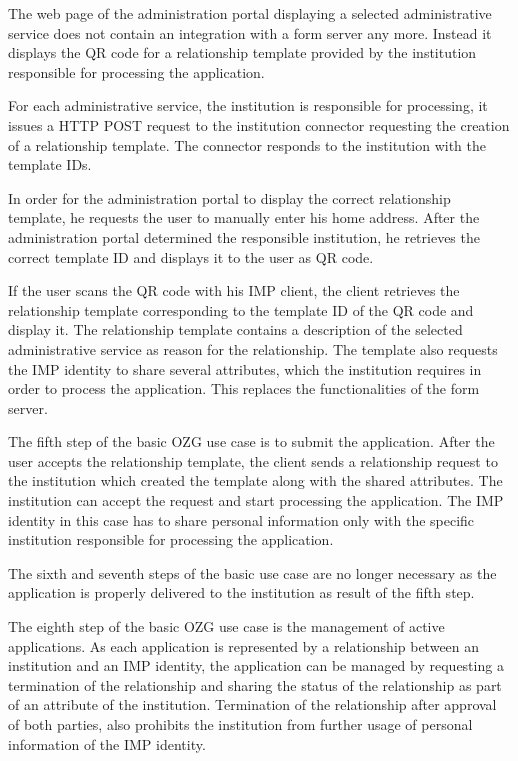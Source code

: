 \documentclass[
     12pt,         %
     a4paper,      %
     BCOR=10mm,version=first,     %
     DIV=14,version=first,        %
     ]{scrreprt}
\begin{document}
The web page of the administration portal displaying a selected administrative service does not contain an integration with a form server any more. Instead it displays the QR code for a relationship template provided by the institution responsible for processing the application.

For each administrative service, the institution is responsible for processing, it issues a HTTP POST request to the institution connector requesting the creation of a relationship template. The connector responds to the institution with the template IDs.

In order for the administration portal to display the correct relationship template, he requests the user to manually enter his home address. After the administration portal determined the responsible institution, he retrieves the correct template ID and displays it to the user as QR code.

If the user scans the QR code with his IMP client, the client retrieves the relationship template corresponding to the template ID of the QR code and display it. The relationship template contains a description of the selected administrative service as reason for the relationship. The template also requests the IMP identity to share several attributes, which the institution requires in order to process the application. This replaces the functionalities of the form server.

The fifth step of the basic OZG use case is to submit the application. After the user accepts the relationship template, the client sends a relationship request to the institution which created the template along with the shared attributes. The institution can accept the request and start processing the application. The IMP identity in this case has to share personal information only with the specific institution responsible for processing the application.

The sixth and seventh steps of the basic use case are no longer necessary as the application is properly delivered to the institution as result of the fifth step.

The eighth step of the basic OZG use case is the management of active applications. As each application is represented by a relationship between an institution and an IMP identity, the application can be managed by requesting a termination of the relationship and sharing the status of the relationship as part of an attribute of the institution. Termination of the relationship after approval of both parties, also prohibits the institution from further usage of personal information of the IMP identity.
\end{document}
